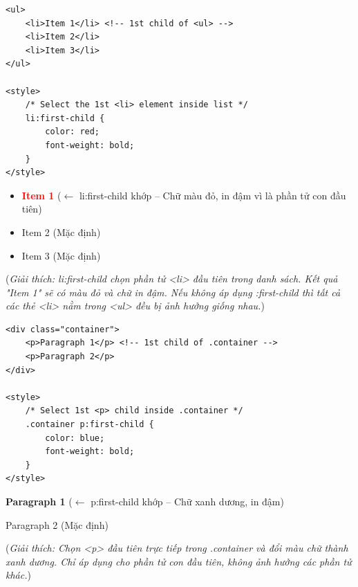 \begin{codeWindow}
\begin{lstlisting}[language=HTML5]
<ul>
    <li>Item 1</li> <!-- 1st child of <ul> -->
    <li>Item 2</li>
    <li>Item 3</li>
</ul>

<style>
    /* Select the 1st <li> element inside list */
    li:first-child {
        color: red;
        font-weight: bold;
    }
</style>
\end{lstlisting}
\end{codeWindow}

\begin{browserWindow}
\sffamily\small
\begin{itemize}[leftmargin=1.5em, itemsep=2pt, parsep=0pt]
    \item \textcolor{red}{\textbf{Item 1}} {\scriptsize\textcolor{gray!60}{($\leftarrow$ li:first-child khớp -- Chữ màu đỏ, in đậm vì là phần tử con đầu tiên)}}
    \item Item 2 {\scriptsize\textcolor{gray!60}{(Mặc định)}}
    \item Item 3 {\scriptsize\textcolor{gray!60}{(Mặc định)}}
\end{itemize}
\par\vspace{3pt}
{\scriptsize\textcolor{gray!60}{(\textit{Giải thích: li:first-child chọn phần tử <li> đầu tiên trong danh sách. Kết quả "Item 1" sẽ có màu đỏ và chữ in đậm. Nếu không áp dụng :first-child thì tất cả các thẻ <li> nằm trong <ul> đều bị ảnh hưởng giống nhau.})}}
\end{browserWindow}

\begin{codeWindow}
\begin{lstlisting}[language=HTML5]
<div class="container">
    <p>Paragraph 1</p> <!-- 1st child of .container -->
    <p>Paragraph 2</p>
</div>

<style>
    /* Select 1st <p> child inside .container */
    .container p:first-child {
        color: blue;
        font-weight: bold;
    }
</style>
\end{lstlisting}
\end{codeWindow}

\begin{browserWindow}
\sffamily\small
\textcolor{primaryBlue}{\textbf{Paragraph 1}} {\scriptsize\textcolor{gray!60}{($\leftarrow$ p:first-child khớp -- Chữ xanh dương, in đậm)}} \par\vspace{2pt}
Paragraph 2 {\scriptsize\textcolor{gray!60}{(Mặc định)}} \par\vspace{3pt}
{\scriptsize\textcolor{gray!60}{(\textit{Giải thích: Chọn <p> đầu tiên trực tiếp trong .container và đổi màu chữ thành xanh dương. Chỉ áp dụng cho phần tử con đầu tiên, không ảnh hưởng các phần tử khác.})}}
\end{browserWindow}

